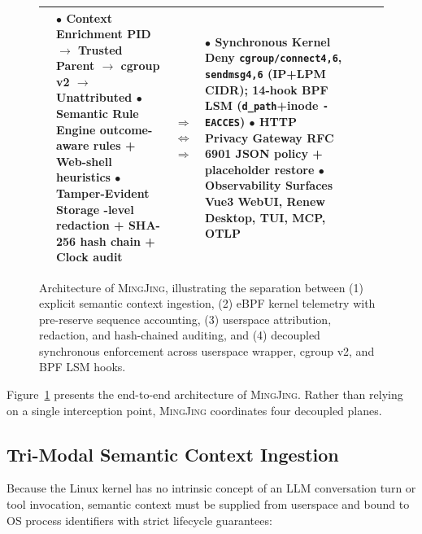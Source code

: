 \documentclass[10pt,twocolumn,letterpaper]{article}
\newcommand{\sys}{\textsc{MingJing}}
\newcommand{\code}[1]{\texttt{\small #1}}
\begin{document}
\begin{figure}[t]
\begin{tabular}{@{}p{}p{}p{}p{}p{}p{}p{}@{}}
& $\bullet$ \textbf{Context Enrichment} \newline PID $\to$ Trusted Parent $\to$ cgroup v2 $\to$ Unattributed \vspace{3pt} \newline
$\bullet$ \textbf{Semantic Rule Engine} \newline 10 outcome-aware rules + Web-shell heuristics \vspace{3pt} \newline
$\bullet$ \textbf{Tamper-Evident Storage} \newline 4-level redaction + SHA-256 hash chain + Clock audit
& $\Longrightarrow$ \newline \vspace{15pt} $\Longleftrightarrow$ \newline \vspace{15pt} $\Longrightarrow$
& $\bullet$ \textbf{Synchronous Kernel Deny} \newline \code{cgroup/connect4,6}, \code{sendmsg4,6} (IP+LPM CIDR); 14-hook BPF LSM (\code{d\_path}+inode \code{-EACCES}) \vspace{3pt} \newline
$\bullet$ \textbf{HTTP Privacy Gateway} \newline RFC 6901 JSON policy + placeholder restore \vspace{3pt} \newline
$\bullet$ \textbf{Observability Surfaces} \newline Vue3 WebUI, Renew Desktop, TUI, MCP, OTLP
\\
\bottomrule
\end{tabular}
\caption{Architecture of \sys{}, illustrating the separation between (1) explicit semantic context ingestion, (2) eBPF kernel telemetry with pre-reserve sequence accounting, (3) userspace attribution, redaction, and hash-chained auditing, and (4) decoupled synchronous enforcement across userspace wrapper, cgroup v2, and BPF LSM hooks.}
\label{fig:arch}
\end{figure}

Figure~\ref{fig:arch} presents the end-to-end architecture of \sys{}. Rather than relying on a single interception point, \sys{} coordinates four decoupled planes.

\subsection{Tri-Modal Semantic Context Ingestion}
Because the Linux kernel has no intrinsic concept of an LLM conversation turn or tool invocation, semantic context must be supplied from userspace and bound to OS process identifiers with strict lifecycle guarantees:
\end{document}
